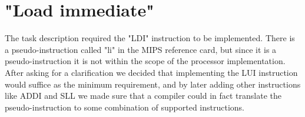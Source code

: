 \section{"Load immediate"}
The task description required the "LDI" instruction to be implemented.
There is a pseudo-instruction called "li" in the MIPS reference card,
but since it is a pseudo-instruction it is not within the scope of the processor implementation.
After asking for a clarification we decided that implementing the LUI instruction would suffice as the minimum requirement,
and by later adding other instructions like ADDI and SLL we made sure that a compiler could in fact translate the pseudo-instruction to some combination of supported instructions.

